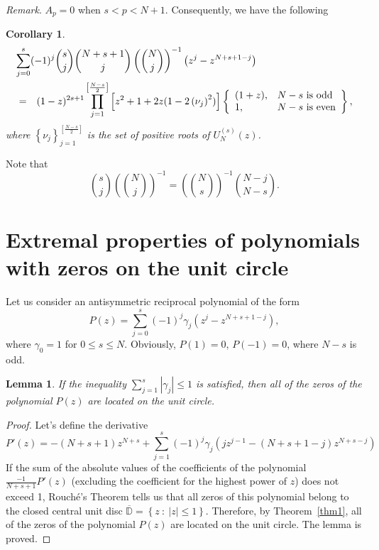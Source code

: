 \documentclass[12pt]{article}
\newtheorem{lemma}[thm]{Lemma}
\newtheorem{corollary}[thm]{Corollary}
\newcommand{\abs}[1]{\left|#1\right|}
\newcommand{\pa}[1]{\left(#1\right)}
\newcommand{\br}[1]{\left[#1\right]}
\newcommand{\cb}[1]{\left\{#1\right\}}
\begin{document}
{\it Remark}. $A_p = 0$ when $s < p < N + 1$. Consequently, we have the following %
\begin{corollary}\label{cor:1}
\begin{eqnarray*}
\lefteqn{\sum_{j = 0}^{s}(-1)^j{s \choose j}{N + s + 1 \choose j}\pa{{N \choose j}}^{-1}\pa{z^j - z^{N + s + 1 - j}}} \\
&=& (1 - z)^{2s + 1} \prod_{j = 1}^{\br{\frac{N - s}{2}}}\br{z^2 + 1 + 2z(1 - 2\pa{\nu_j}^2)}\left\{\begin{array}{ll}
(1 + z), & N - s \mbox{ is odd} \\
1, & N - s \mbox{ is even}
\end{array}\right\},
\end{eqnarray*}
where $\cb{\nu_j}_{j = 1}^{\br{\frac{N - s}{2}}}$ is the set of positive roots of $U_N^{(s)}(z)$.
\end{corollary}

Note that 
$$
{s\choose j}\left({N\choose j}\right)^{-1}=\left({N\choose s}\right)^{-1}{N-j\choose N-s}.
$$


\section{Extremal properties of polynomials with zeros on the unit circle}

Let us consider an antisymmetric reciprocal polynomial of the form
\begin{equation}\label{eqn8}
P(z) = \sum_{j = 0}^s(-1)^j\gamma_j\pa{z^j - z^{N + s + 1 - j}},
\end{equation}
where $\gamma_0 = 1$ for $0 \leq s \leq N$. Obviously, $P(1) = 0$, $P(-1) = 0$, where $N - s$ is odd.


\begin{lemma}\label{lem3}
If the inequality $\displaystyle \sum_{j = 1}^{s} \abs{\gamma_j} \leq 1$ is satisfied, then all of the zeros of the polynomial $P(z)$ are located on the unit circle.
\end{lemma}

\begin{proof}
Let's define the derivative
\begin{displaymath}
P'(z) = -(N + s + 1)z^{N + s} + \sum_{j = 1}^{s}(-1)^j\gamma_j\pa{jz^{j - 1} - (N + s + 1 - j)z^{N + s - j}}
\end{displaymath}
If the sum of the absolute values of the coefficients of the polynomial $\displaystyle \frac{-1}{N + s + 1}P'(z)$ (excluding the coefficient for the highest power of $z$) does not exceed 1, Rouch\'{e}'s Theorem tells us that all zeros of this polynomial belong to the closed central unit disc $\overline{\mathbb D} = \cb{z \ : \ \abs{z} \leq 1}$.  Therefore, by Theorem~\ref{thm1}, all of the zeros of the polynomial $P(z)$ are located on the unit circle. The lemma is proved.
\end{proof}
\end{document}
